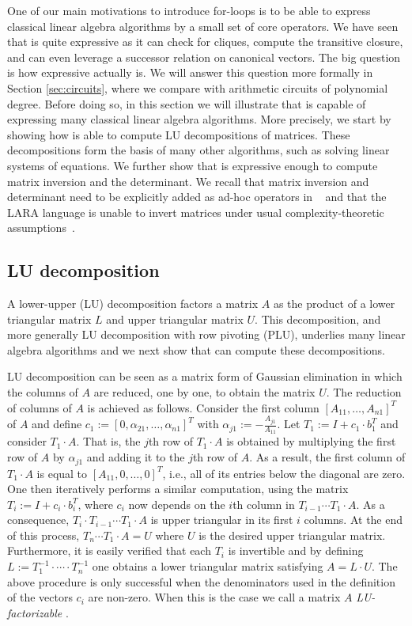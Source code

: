 
One of our main motivations to introduce for-loops is to be able to express classical linear algebra algorithms by a small set of core operators. We have seen that \langfor is
quite expressive as it can check for cliques, compute the transitive closure, and can even
leverage a successor relation on canonical vectors. The big question is how expressive \langfor
actually is. We will answer this question more formally in Section \ref{sec:circuits}, where we compare \langfor with 
arithmetic circuits of polynomial degree.
Before doing so, in this section we will illustrate that \langfor is capable of expressing many classical linear algebra algorithms. More precisely, we start by showing how  \langfor is able to
compute LU decompositions of matrices. These decompositions form the basis of many other algorithms, such as solving linear systems of equations. We further show that \langfor is expressive enough to compute matrix inversion and the determinant. We recall that matrix inversion and determinant need to be explicitly added as ad-hoc operators in \lang~\cite{matlang-journal} and that the LARA language is unable to invert matrices under usual complexity-theoretic assumptions~\cite{BarceloH0S20}.


\subsection{LU decomposition}
A lower-upper (LU) decomposition factors a matrix $A$ as the product of a lower triangular matrix $L$ and upper triangular matrix $U$.  
This decomposition, and more generally LU decomposition with row pivoting (PLU),  underlies many linear algebra algorithms and 
we next show that \langfor can compute these decompositions.

LU decomposition can be seen as a matrix form of Gaussian elimination in which the columns of $A$
are reduced, one by one, to obtain the matrix $U$. The reduction of columns of $A$ is achieved
as follows. Consider the first column $[A_{11},\ldots,A_{n1}]^T$ of $A$ and  define 
$c_1 := [0, \alpha_{21},\ldots, \alpha_{n1}]^T$ 
with $\alpha_{j1} := -\frac{A_{j1}}{A_{11}}$. Let $T_1:=I+ c_1\cdot b_1^T$ and consider
$T_1\cdot A$. That is, the $j$th row of $T_1\cdot A$ is obtained by multiplying the first row of $A$ by $\alpha_{j1}$ and adding it to the $j$th row of $A$. As a result, the first column of $T_1\cdot A$ is equal to $[A_{11},0,\ldots,0]^T$, i.e., 
all of its entries below the diagonal are zero.  One then iteratively performs a similar computation, using the matrix $T_i:=I+c_i\cdot b_i^T$, where $c_i$ now depends on the $i$th column in $T_{i-1}\cdots T_1\cdot A$. As a consequence, $T_i\cdot T_{i-1}\cdots T_1\cdot A$ is upper triangular
in its first $i$ columns. At the end of this process, $T_n\cdots T_1\cdot A=U$ where $U$ is the desired upper triangular matrix.
Furthermore, it is easily verified that each $T_i$ is invertible and by defining $L:=T_1^{-1}\cdot\cdots\cdot T_n^{-1}$ one obtains a lower triangular matrix satisfying $A=L\cdot U$. The above procedure is only successful when the denominators used in the definition of the vectors $c_i$ are non-zero. When this is the case we call a matrix $A$ \textit{LU-factorizable} \cite{num}. 

